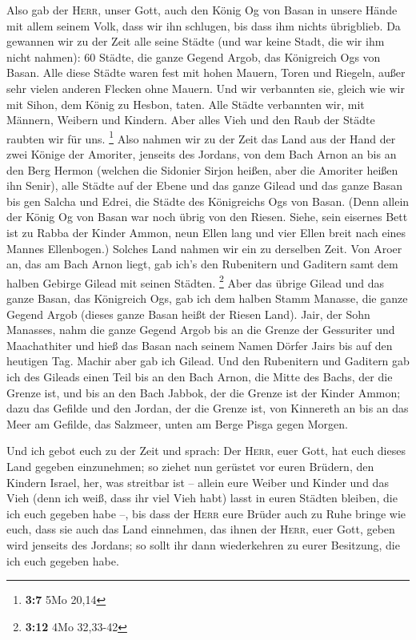  Also gab der \textsc{Herr}, unser Gott, auch den König Og
von Basan in unsere Hände mit allem seinem Volk, dass wir ihn schlugen,
bis dass ihm nichts übrigblieb.  Da gewannen wir zu der
Zeit alle seine Städte (und war keine Stadt, die wir ihm nicht nahmen):
60 Städte, die ganze Gegend Argob, das Königreich Ogs von Basan.
 Alle diese Städte waren fest mit hohen Mauern, Toren und
Riegeln, außer sehr vielen anderen Flecken ohne Mauern. 
Und wir verbannten sie, gleich wie wir mit Sihon, dem König zu Hesbon,
taten. Alle Städte verbannten wir, mit Männern, Weibern und Kindern.
 Aber alles Vieh und den Raub der Städte raubten wir für
uns. \footnote{\textbf{3:7} 5Mo 20,14}  Also nahmen wir zu
der Zeit das Land aus der Hand der zwei Könige der Amoriter, jenseits
des Jordans, von dem Bach Arnon an bis an den Berg Hermon 
(welchen die Sidonier Sirjon heißen, aber die Amoriter heißen ihn
Senir),  alle Städte auf der Ebene und das ganze Gilead
und das ganze Basan bis gen Salcha und Edrei, die Städte des Königreichs
Ogs von Basan.  (Denn allein der König Og von Basan war
noch übrig von den Riesen. Siehe, sein eisernes Bett ist zu Rabba der
Kinder Ammon, neun Ellen lang und vier Ellen breit nach eines Mannes
Ellenbogen.)  Solches Land nahmen wir ein zu derselben
Zeit. Von Aroer an, das am Bach Arnon liegt, gab ich's den Rubenitern
und Gaditern samt dem halben Gebirge Gilead mit seinen Städten.
\footnote{\textbf{3:12} 4Mo 32,33-42}  Aber das übrige
Gilead und das ganze Basan, das Königreich Ogs, gab ich dem halben Stamm
Manasse, die ganze Gegend Argob (dieses ganze Basan heißt der Riesen
Land).  Jair, der Sohn Manasses, nahm die ganze Gegend
Argob bis an die Grenze der Gessuriter und Maachathiter und hieß das
Basan nach seinem Namen Dörfer Jairs bis auf den heutigen Tag.
 Machir aber gab ich Gilead.  Und den
Rubenitern und Gaditern gab ich des Gileads einen Teil bis an den Bach
Arnon, die Mitte des Bachs, der die Grenze ist, und bis an den Bach
Jabbok, der die Grenze ist der Kinder Ammon;  dazu das
Gefilde und den Jordan, der die Grenze ist, von Kinnereth an bis an das
Meer am Gefilde, das Salzmeer, unten am Berge Pisga gegen Morgen.

 Und ich gebot euch zu der Zeit und sprach: Der
\textsc{Herr}, euer Gott, hat euch dieses Land gegeben einzunehmen; so
ziehet nun gerüstet vor euren Brüdern, den Kindern Israel, her, was
streitbar ist --  allein eure Weiber und Kinder und das
Vieh (denn ich weiß, dass ihr viel Vieh habt) lasst in euren Städten
bleiben, die ich euch gegeben habe --,  bis dass der
\textsc{Herr} eure Brüder auch zu Ruhe bringe wie euch, dass sie auch
das Land einnehmen, das ihnen der \textsc{Herr}, euer Gott, geben wird
jenseits des Jordans; so sollt ihr dann wiederkehren zu eurer Besitzung,
die ich euch gegeben habe.

